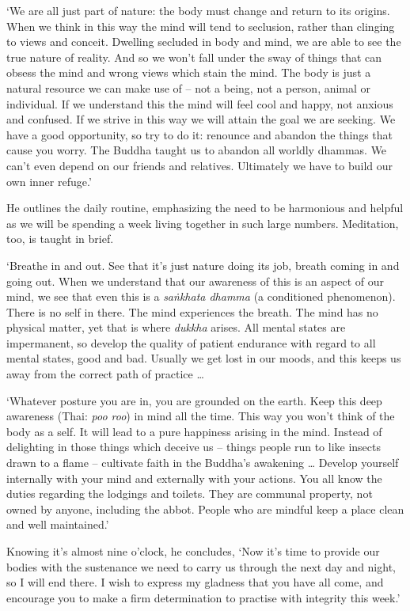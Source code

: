 `We are all just part of nature: the body must change and return to its
origins. When we think in this way the mind will tend to seclusion, 
rather than clinging to views and conceit. Dwelling secluded in body and
mind, we are able to see the true nature of reality. And so we won't
fall under the sway of things that can obsess the mind and wrong views
which stain the mind. The body is just a natural resource we can make
use of -- not a being, not a person, animal or individual. If we
understand this the mind will feel cool and happy, not anxious and
confused. If we strive in this way we will attain the goal we are
seeking. We have a good opportunity, so try to do it: renounce and
abandon the things that cause you worry. The Buddha taught us to abandon
all worldly dhammas. We can't even depend on our friends and relatives. 
Ultimately we have to build our own inner refuge.'

He outlines the daily routine, emphasizing the need to be harmonious and
helpful as we will be spending a week living together in such large
numbers. Meditation, too, is taught in brief.

`Breathe in and out. See that it's just nature doing its job, breath
coming in and going out. When we understand that our awareness of this
is an aspect of our mind, we see that even this is a
\emph{saṅkhata dhamma} (a conditioned phenomenon). There is no self in
there. The mind experiences the breath. The mind has no physical matter, 
yet that is where \emph{dukkha} arises. All mental states are
impermanent, so develop the quality of patient endurance with regard to
all mental states, good and bad. Usually we get lost in our moods, and
this keeps us away from the correct path of practice \ldots{}

`Whatever posture you are in, you are grounded on the earth. Keep this
deep awareness (Thai: \emph{poo roo}) in mind all the time. This way you
won't think of the body as a self. It will lead to a pure happiness
arising in the mind. Instead of delighting in those things which deceive
us -- things people run to like insects drawn to a flame -- cultivate
faith in the Buddha's awakening \ldots{} Develop yourself internally
with your mind and externally with your actions. You all know the duties
regarding the lodgings and toilets. They are communal property, not
owned by anyone, including the abbot. People who are mindful keep a
place clean and well maintained.'

Knowing it's almost nine o'clock, he concludes, `Now it's time to
provide our bodies with the sustenance we need to carry us through the
next day and night, so I will end there. I wish to express my gladness
that you have all come, and encourage you to make a firm determination
to practise with integrity this week.'

